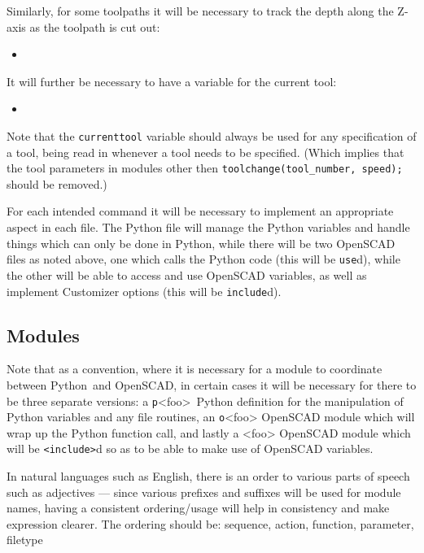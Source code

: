 \documentclass{ltxdoc}
\begin{document}
\begin{samepage}
\noindent Similarly, for some toolpaths it will be necessary to track the depth along the Z-axis
as the toolpath is cut out:
 
\begin{itemize}
 \item {}
\end{itemize}
\end{samepage}

\begin{samepage}
\noindent It will further be necessary to have a variable for the current tool:

\begin{itemize}
 \item {}
\end{itemize}
\end{samepage}

Note that the \verb|currenttool| variable should always be used for any specification 
of a tool, being read in whenever a tool needs to be specified. (Which implies that 
the tool parameters in modules other then \verb|toolchange(tool_number, speed);| 
should be removed.)

For each intended command it will be necessary to implement an appropriate aspect in each file. 
The Python file will manage the Python variables and handle things which can only be done in 
Python, while there will be two OpenSCAD files as noted above, one which calls the Python code 
(this will be \texttt{use}d), while the other will be able to access
and use OpenSCAD variables, as well as implement Customizer options
(this will be \texttt{include}d).

\subsection{Modules}

Note that as a convention, where it is necessary for a module to coordinate between 
Python~and OpenSCAD, in certain cases it will be necessary for there to be three separate 
versions: a \texttt{p}<foo>~Python definition for the manipulation of Python variables and
any file routines, an \texttt{o}<foo> OpenSCAD module which will wrap up the Python
function call, and lastly a <foo> OpenSCAD module which will be \texttt{<include>}d 
so as to be able to make use of OpenSCAD variables.

In natural languages such as English, there is an order to various parts of speech such as 
adjectives 
--- since various prefixes and suffixes will be used for module names, having a consistent 
ordering/usage will help in consistency and make expression clearer.
The ordering should be: sequence, action, function, parameter, filetype
\end{document}
